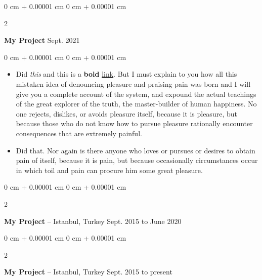 \documentclass[10pt, letterpaper]{article}
\newenvironment{highlights}{
    \begin{itemize}[
        topsep=0.10 cm,
        parsep=0.10 cm,
        partopsep=0pt,
        itemsep=0pt,
        leftmargin=0 cm + 10pt
    ]
}{
    \end{itemize}
} %
\newenvironment{onecolentry}{
    \begin{adjustwidth}{
        0 cm + 0.00001 cm
    }{
        0 cm + 0.00001 cm
    }
}{
    \end{adjustwidth}
} %
\newenvironment{twocolentry}[2][]{
    \onecolentry
    \def\secondColumn{#2}
    \setcolumnwidth{\fill, 4.5 cm}
    \begin{paracol}{2}
}{
    \switchcolumn \raggedleft \secondColumn
    \end{paracol}
    \endonecolentry
} %
\begin{document}
        \vspace{0.2 cm}

        \begin{twocolentry}{
            Sept. 2021
        }
            \textbf{My Project}\end{twocolentry}

        \vspace{0.10 cm}
        \begin{onecolentry}
            \begin{highlights}
                \item Did \textit{this} and this is a \textbf{bold} \href{https://example.com}{link}. But I must explain to you how all this mistaken idea of denouncing pleasure and praising pain was born and I will give you a complete account of the system, and expound the actual teachings of the great explorer of the truth, the master-builder of human happiness. No one rejects, dislikes, or avoids pleasure itself, because it is pleasure, but because those who do not know how to pursue pleasure rationally encounter consequences that are extremely painful.
                \item Did that. Nor again is there anyone who loves or pursues or desires to obtain pain of itself, because it is pain, but because occasionally circumstances occur in which toil and pain can procure him some great pleasure.
            \end{highlights}
        \end{onecolentry}


        \vspace{0.2 cm}

        \begin{twocolentry}{
            Sept. 2015 to June 2020
        }
            \textbf{My Project} -- Istanbul, Turkey\end{twocolentry}



        \vspace{0.2 cm}

        \begin{twocolentry}{
            Sept. 2015 to present
        }
            \textbf{My Project} -- Istanbul, Turkey\end{twocolentry}
\end{document}
